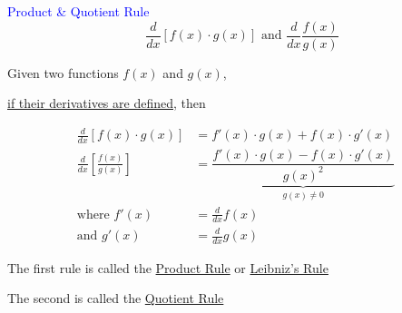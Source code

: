 \documentclass[14pt,fleqn]{extarticle}
\begin{document}
 

\textcolor{blue}{Product \& Quotient Rule}
\[ \quad \frac{d}{dx}\left[ f(x)\cdot g(x) \right]\text{ and } \frac{d}{dx}\frac{f(x)}{g(x)}\]

\newcard 

Given two functions $f(x)$ and $g(x)$, 

\underline{if their derivatives are defined}, then

%
\begin{align}
\frac{d}{dx}\left[ f(x)\cdot g(x) \right] &= f'(x)\cdot g(x) + f(x)\cdot g'(x) \\ 
\frac{d}{dx}\left[ \frac{f(x)}{g(x)}\right] &= \underbrace{\dfrac{f'(x)\cdot g(x) - f(x)\cdot g'(x) }{g(x)^2}}_{g(x)\neq 0}\\
\text{where } f'(x) &= \frac{d}{dx}f(x) \\
\text{and } g'(x) &= \frac{d}{dx} g(x) 
\end{align}

The first rule is called the \underline{Product Rule} or 
\underline{Leibniz's Rule}\newline 

The second is called the \underline{Quotient Rule}
%
\end{document}
